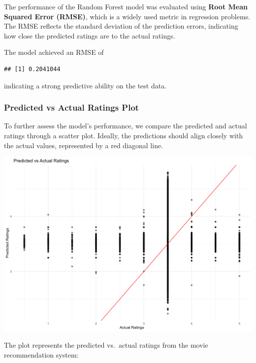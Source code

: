 \documentclass[
]{article}
\begin{document}
The performance of the Random Forest model was evaluated using
\textbf{Root Mean Squared Error (RMSE)}, which is a widely used metric
in regression problems. The RMSE reflects the standard deviation of the
prediction errors, indicating how close the predicted ratings are to the
actual ratings.

The model achieved an RMSE of

\begin{verbatim}
## [1] 0.2041044
\end{verbatim}

indicating a strong predictive ability on the test data.

\subsubsection{Predicted vs Actual Ratings
Plot}\label{predicted-vs-actual-ratings-plot}

To further assess the model's performance, we compare the predicted and
actual ratings through a scatter plot. Ideally, the predictions should
align closely with the actual values, represented by a red diagonal
line.

\includegraphics[width=1\linewidth]{../model/predicted_vs_actual_ratings}

The plot represents the predicted vs.~actual ratings from the movie
recommendation system:
\end{document}
